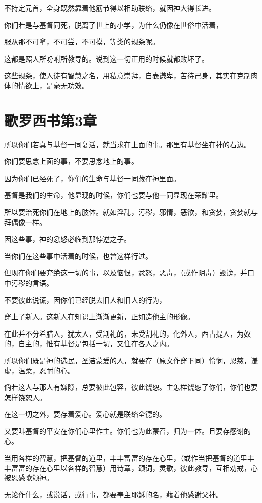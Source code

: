 \documentclass[12pt,oneside]{book}
\begin{document}
不持定元首，全身既然靠着他筋节得以相助联络，就因神大得长进。

你们若是与基督同死，脱离了世上的小学，为什么仍像在世俗中活着，

服从那不可拿，不可尝，不可摸，等类的规条呢。

这都是照人所吩咐所教导的。说到这一切正用的时候就都败坏了。

这些规条，使人徒有智慧之名，用私意崇拜，自表谦卑，苦待己身，其实在克制肉体的情欲上，是毫无功效。

\chapter{歌罗西书第3章}
所以你们若真与基督一同复活，就当求在上面的事。那里有基督坐在神的右边。

你们要思念上面的事，不要思念地上的事。

因为你们已经死了，你们的生命与基督一同藏在神里面。

基督是我们的生命，他显现的时候，你们也要与他一同显现在荣耀里。

所以要治死你们在地上的肢体。就如淫乱，污秽，邪情，恶欲，和贪婪，贪婪就与拜偶像一样。

因这些事，神的忿怒必临到那悖逆之子。

当你们在这些事中活着的时候，也曾这样行过。

但现在你们要弃绝这一切的事，以及恼恨，忿怒，恶毒，（或作阴毒）毁谤，并口中污秽的言语。

不要彼此说谎，因你们已经脱去旧人和旧人的行为，

穿上了新人。这新人在知识上渐渐更新，正如造他主的形像。

在此并不分希腊人，犹太人，受割礼的，未受割礼的，化外人，西古提人，为奴的，自主的，惟有基督是包括一切，又住在各人之内。

所以你们既是神的选民，圣洁蒙爱的人，就要存（原文作穿下同）怜悯，恩慈，谦虚，温柔，忍耐的心。

倘若这人与那人有嫌隙，总要彼此包容，彼此饶恕。主怎样饶恕了你们，你们也要怎样饶恕人。

在这一切之外，要存着爱心。爱心就是联络全德的。

又要叫基督的平安在你们心里作主。你们也为此蒙召，归为一体。且要存感谢的心。

当用各样的智慧，把基督的道里，丰丰富富的存在心里，（或作当把基督的道里丰丰富富的存在心里以各样的智慧）用诗章，颂词，灵歌，彼此教导，互相劝戒，心被恩感歌颂神。

无论作什么，或说话，或行事，都要奉主耶稣的名，藉着他感谢父神。
\end{document}
